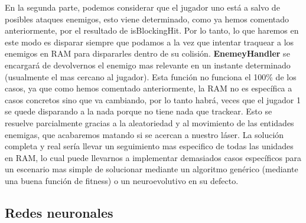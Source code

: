 En la segunda parte, podemos considerar que el jugador uno está a salvo de posibles ataques enemigos, esto viene determinado, como ya hemos comentado anteriormente, por el resultado de isBlockingHit. Por lo tanto, lo que haremos en este modo es disparar siempre que podamos a la vez que intentar traquear a los enemigos en RAM para dispararles dentro de su colisión. \textbf{EnemeyHandler} se encargará de devolvernos el enemigo mas relevante en un instante determinado (usualmente el mas cercano al jugador). Esta función no funciona el 100\% de los casos, ya que como hemos comentado anteriormente, la RAM no es específica a casos concretos sino que va cambiando, por lo tanto habrá, veces que el jugador 1 se quede disparando a la nada porque no tiene nada que trackear. Esto se resuelve parcialmente gracias a la aleatoriedad y al movimiento de las entidades enemigas, que acabaremos matando si se acercan a nuestro láser. La solución completa y real sería llevar un seguimiento mas especifico de todas las unidades en RAM, lo cual puede llevarnos a implementar demasiados casos específicos para un escenario mas simple de solucionar mediante un algoritmo genérico (mediante una buena función de fitness) o un neuroevolutivo en su defecto.


\newpage
\subsection{Redes neuronales}
\label{subsec:nn}


\newpage